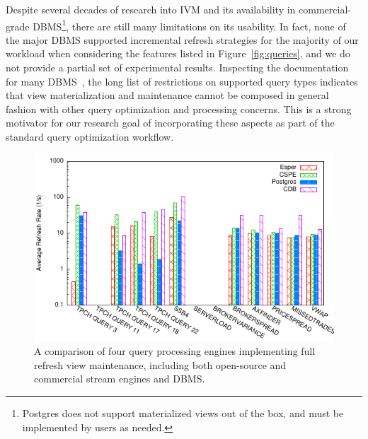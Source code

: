 \vspace{1mm}
Despite several decades of research into IVM and its availability in
commercial-grade DBMS\footnote{Postgres does not support materialized views out
of the box, and must be implemented by users as needed.}, there are still many
limitations on its usability. In fact, none of the major DBMS supported
incremental refresh strategies for the majority of our workload when considering
the features listed in Figure~\ref{fig:queries}, and we do not provide a partial
set of experimental results. Inspecting the documentation for many
DBMS~, the long list of restrictions on supported query
types indicates that view materialization and maintenance cannot be composed in
general fashion with other query optimization and processing concerns. This is a
strong motivator for our research goal of incorporating these aspects as part of
the standard query optimization workflow.

\begin{figure}[htbp]
\begin{center}
\includegraphics[scale=0.85]{../graphs/graphs/engine_bakeoff.pdf}
\end{center}
\vspace{-4mm}
\caption{A comparison of four query processing engines implementing full refresh
view maintenance, including both open-source and commercial stream engines and
DBMS.}
\label{fig:enginecomp}
\end{figure}

